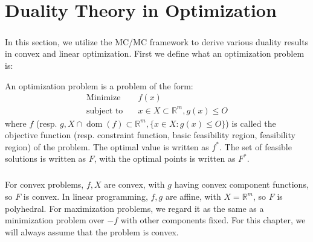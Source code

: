 \chapter{Duality Theory in Optimization}
\label{chap:04}

\paragraph{}In this section, we utilize the MC/MC framework to derive various duality results in convex and linear optimization. First we define what an optimization problem is:

\begin{defn}\label{defn:040-opt-prob}
	An optimization problem is a problem of the form:
	\begin{align*}
		\text{Minimize}\quad   & f(x)                                   \\
		\text{subject to}\quad & x\in X\subset \mathbb{R}^m, g(x)\leq O
	\end{align*}
	where $f$ (resp. $g,X\cap \operatorname{dom}(f)\subset \mathbb{R}^m,\{x\in X:g(x)\leq O\}$) is called the objective function (resp. constraint function, basic feasibility region, feasibility region) of the problem. The optimal value is written as $f^\ast$. The set of feasible solutions is written as $F$, with the optimal points is written as $F^\ast$.
\end{defn}

\paragraph{}For convex problems, $f,X$ are convex, with $g$ having convex component functions, so $F$ is convex. In linear programming, $f,g$ are affine, with $X=\mathbb{R}^m$, so $F$ is polyhedral. For maximization problems, we regard it as the same as a minimization problem over $-f$ with other components fixed. For this chapter, we will always assume that the problem is convex.







